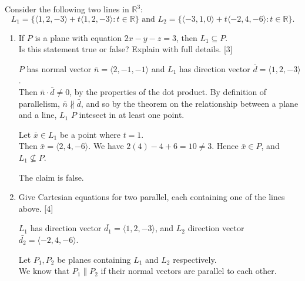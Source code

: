 \documentclass[11pt]{article}
\begin{document}
Consider the following two lines in \(\mathbb{R}^3\):
    \[
        L_1 = \{\langle1,2,-3\rangle + t\langle1,2,-3\rangle : t \in \mathbb{R}\}
        \text{ and }
        L_2 = \{\langle-3,1,0\rangle + t\langle-2,4,-6\rangle : t \in \mathbb{R}\}.
    \]
\begin{enumerate}[label=\alph*), series=Last]
    \item If \(P\) is a plane with equation \(2x-y-z=3\), then \(L_1 \subseteq P\).\\
    Is this statement true or false? Explain with full details. \hfill [3]

    \color{blue}
    \(P\) has normal vector \(\bar{n} = \langle 2,-1,-1\rangle\) and \(L_1\) has direction vector \(\bar{d} = \langle 1,2,-3\rangle\).\\
    Then \(\bar{n} \cdot \bar{d} \neq 0\), by the properties of the dot product. By definition of parallelism, \(\bar{n} \nparallel  \bar{d}\), and
    so by the theorem on the relationship between a plane and a line, \(L_1\) \(P\) intesect in at least one point.

    Let \(\bar{x} \in L_1\) be a point where \(t = 1\).\\
    Then \(\bar{x} = \langle2,4,-6\rangle.\)
    We have \( 2(4) -4 + 6 = 10 \neq 3\). Hence \(\bar{x} \in P\), and \(L_1 \nsubseteq P\).

    The claim is false.

    \color{black}

    \item Give Cartesian equations for two parallel, each containing one of the lines above. \hfill [4]
    \color{blue}

    \(L_1\) has direction vector \(\bar{d_1} = \langle1,2,-3\rangle\), and \(L_2\) direction vector \(\bar{d_2} = \langle-2,4,-6\rangle\).

    Let \(P_1,P_2\) be planes containing \(L_1\) and \(L_2\) respectively.\\
    We know that \(P_1\parallel P_2\) if their normal vectors are parallel to each other.

    \vspace{1em}


\end{enumerate}
\end{document}
